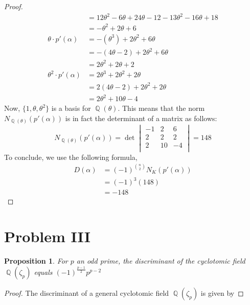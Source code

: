 \documentclass{article}
\newtheorem{proposition}[theorem]{Proposition}
\DeclareMathOperator{\Q}{\mathbb{Q}}
\begin{document}
\begin{proof}
\begin{align*}
	&= 12\theta^2-6\theta+24\theta-12-13\theta^2-16\theta+18\\
	&=-\theta^2+2\theta+6\\
	\theta\cdot p'(\alpha)&=-(\theta^3)+2\theta^2+6\theta\\
	&= -(4\theta-2)+2\theta^2+6\theta\\
	&= 2\theta^2+2\theta+2\\
	\theta^2\cdot p'(\alpha) &= 2\theta^3+2\theta^2+2\theta\\
	&= 2(4\theta-2)+2\theta^2+2\theta\\
	&= 2\theta^2+10\theta-4
	\end{align*}
	Now, $\{1,\theta,\theta^2\}$ is a basis for $\Q(\theta)$.  This means that the norm $N_{\Q(\theta)}(p'(\alpha))$ is in fact the determinant of a matrix as follows:
	$$N_{\Q(\theta)}(p'(\alpha))=\det\begin{vmatrix}
		-1 & 2 & 6\\
		2& 2& 2\\
		2&10&-4\\
	\end{vmatrix} = 148$$
	To conclude, we use the following formula,
	\begin{align*}
	D(\alpha) &= (-1)^{n\choose 2}N_K(p'(\alpha))\\
	&= (-1)^3 (148)\\
	&= -148
	\end{align*}
\end{proof}
\section{Problem III}
\begin{proposition}
	For $p$ an odd prime, the discriminant of the cyclotomic field $\Q(\zeta_p)$ equals $(-1)^{\frac{p-1}{2}}p^{p-2}$
\end{proposition}
\begin{proof}
	The discriminant of a general cyclotomic field $\Q(\zeta_p)$ is given by 
\end{proof}
\end{document}
